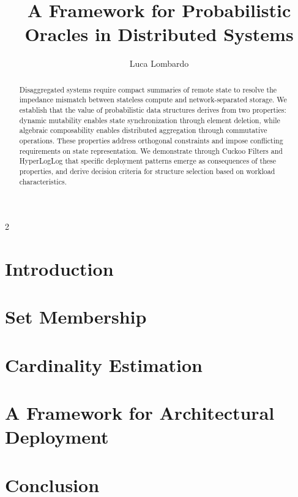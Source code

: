\documentclass[11pt]{article}
\title{A Framework for Probabilistic Oracles in Distributed Systems}
\author{Luca Lombardo}
\date{}
\theoremstyle{definition}
\theoremstyle{remark}
\begin{document}
\maketitle

\begin{abstract}
    Disaggregated systems require compact summaries of remote state to resolve the impedance mismatch between stateless compute and network-separated storage. We establish that the value of probabilistic data structures derives from two properties: dynamic mutability enables state synchronization through element deletion, while algebraic composability enables distributed aggregation through commutative operations. These properties address orthogonal constraints and impose conflicting requirements on state representation. We demonstrate through Cuckoo Filters and HyperLogLog that specific deployment patterns emerge as consequences of these properties, and derive decision criteria for structure selection based on workload characteristics.
\end{abstract}



\begin{multicols}{2}
    \section{Introduction}
    \label{sec:introduction}
    

    \section{Set Membership}
    \label{sec:membership}
    

    \section{Cardinality Estimation}
    \label{sec:cardinality}
    

    \section{A Framework for Architectural Deployment}
    \label{sec:framework}
    

    \section{Conclusion}
    \label{sec:conclusion}
    


    
    
    \nocite{*}
\end{multicols}
\end{document}
